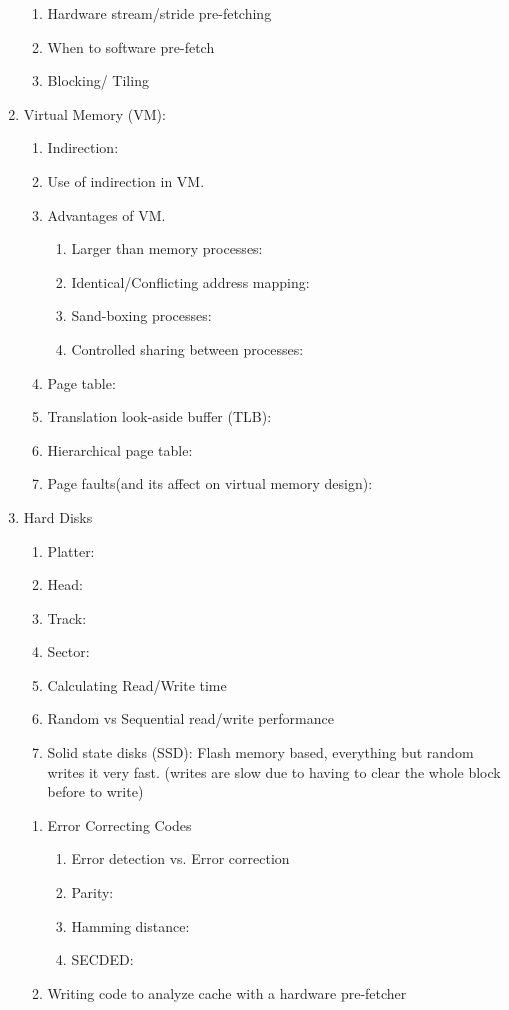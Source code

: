 \documentclass[12pt]{article}
\renewcommand{\=}[1]{\stackrel{#1}{=}} %
\theoremstyle{definition}
\theoremstyle{remark}
\begin{document}
\begin{center}
\begin{enumerate}
\begin{enumerate}
    \item Hardware stream/stride pre-fetching
    \item When to software pre-fetch
    \item Blocking/ Tiling
    \end{enumerate}
  \item Virtual Memory (VM):
    \begin{enumerate}
    \item Indirection:
    \item Use of indirection in VM.
    \item Advantages of VM.
      \begin{enumerate}
      \item Larger than memory processes: 
      \item Identical/Conflicting address mapping:
      \item Sand-boxing processes:
      \item Controlled sharing between processes:
      \end{enumerate}
    \item Page table:
    \item Translation look-aside buffer (TLB):
    \item Hierarchical page table:
    \item Page faults(and its affect on virtual memory design):
    \end{enumerate}
  \item Hard Disks
    \begin{enumerate}
    \item Platter:
    \item Head:
    \item Track:
    \item Sector:
    \item Calculating Read/Write time
    \item Random vs Sequential read/write performance
    \item Solid state disks (SSD): Flash memory based, everything but
      random writes it very fast. (writes are slow due to having to
      clear the whole block before to write)
    \end{enumerate}
    \begin{enumerate}
    \item Error Correcting Codes
      \begin{enumerate}
      \item Error detection vs. Error correction
      \item Parity:
      \item Hamming distance:
      \item SECDED: 
      \end{enumerate}
    \item Writing code to analyze cache with a hardware pre-fetcher
    \end{enumerate}
  \end{enumerate}
    
\end{center}
\end{document}
